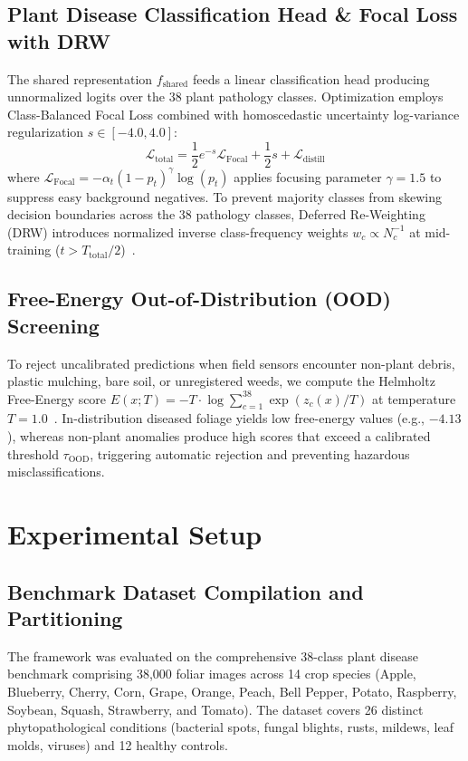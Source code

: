 \documentclass[runningheads]{llncs}
\begin{document}
\subsection{Plant Disease Classification Head \& Focal Loss with DRW}
The shared representation $f_{\text{shared}}$ feeds a linear classification head producing unnormalized logits over the 38 plant pathology classes. Optimization employs Class-Balanced Focal Loss combined with homoscedastic uncertainty log-variance regularization $s \in [-4.0, 4.0]$:
\begin{equation}
\mathcal{L}_{\text{total}} = \frac{1}{2} e^{-s} \mathcal{L}_{\text{Focal}} + \frac{1}{2} s + \mathcal{L}_{\text{distill}}
\end{equation}
where $\mathcal{L}_{\text{Focal}} = - \alpha_t (1 - p_t)^\gamma \log(p_t)$ applies focusing parameter $\gamma = 1.5$ to suppress easy background negatives. To prevent majority classes from skewing decision boundaries across the 38 pathology classes, Deferred Re-Weighting (DRW) introduces normalized inverse class-frequency weights $w_c \propto N_c^{-1}$ at mid-training ($t > T_{\text{total}}/2$)~\cite{ref_arshad2026}.

\subsection{Free-Energy Out-of-Distribution (OOD) Screening}
To reject uncalibrated predictions when field sensors encounter non-plant debris, plastic mulching, bare soil, or unregistered weeds, we compute the Helmholtz Free-Energy score $E(x; T) = - T \cdot \log \sum_{c=1}^{38} \exp(z_c(x)/T)$ at temperature $T=1.0$~\cite{ref_lapkovskis2024}. In-distribution diseased foliage yields low free-energy values (e.g., $-4.13$), whereas non-plant anomalies produce high scores that exceed a calibrated threshold $\tau_{\text{OOD}}$, triggering automatic rejection and preventing hazardous misclassifications.

\section{Experimental Setup}
\subsection{Benchmark Dataset Compilation and Partitioning}
The framework was evaluated on the comprehensive 38-class plant disease benchmark comprising 38,000 foliar images across 14 crop species (Apple, Blueberry, Cherry, Corn, Grape, Orange, Peach, Bell Pepper, Potato, Raspberry, Soybean, Squash, Strawberry, and Tomato). The dataset covers 26 distinct phytopathological conditions (bacterial spots, fungal blights, rusts, mildews, leaf molds, viruses) and 12 healthy controls.
\end{document}
